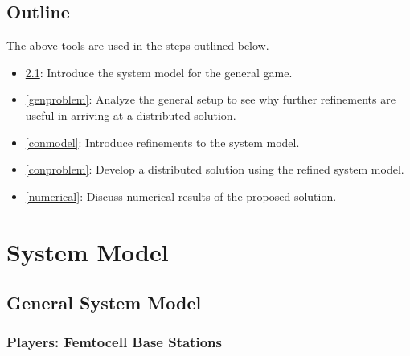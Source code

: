 \documentclass[12pt,a4paper]{report}
\begin{document}
\section{Outline}
The above tools are used in the steps outlined below. 
\begin{itemize}
\item 
\ref{genmodel}: Introduce the system model for the general game.
\item 
\ref{genproblem}: Analyze the general setup to see why further refinements are useful in arriving at a distributed solution. 
\item
\ref{conmodel}: Introduce refinements to the system model.
\item 
\ref{conproblem}: Develop a distributed solution using the refined system model.
\item 
\ref{numerical}: Discuss numerical results of the proposed solution. 
\end{itemize}
\chapter{System Model}

\section{General System Model}\label{genmodel}

\subsection{Players: Femtocell Base Stations}
\end{document}
